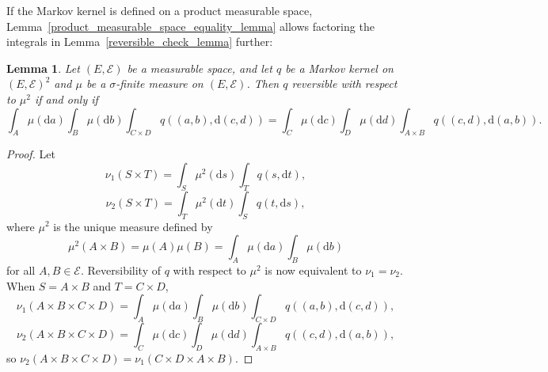 \documentclass[english,twoside,openright]{HYgraduMLDS}
\newtheorem{lemma}{Lemma}[chapter]
\newcommand{\dx}{\mathrm{d}}
\begin{document}
If the Markov kernel is defined on a product measurable space,
Lemma~\ref{product_measurable_space_equality_lemma} allows factoring
the integrals in Lemma~\ref{reversible_check_lemma} further:
\begin{lemma}\label{reversible_check_product_lemma}
	Let \((E, \mathcal{E})\) be a measurable space, and let \(q\) be a Markov
  kernel on \((E, \mathcal{E})^{2}\) and \(\mu\) be a \(\sigma\)-finite measure
  on \((E, \mathcal{E})\).
  Then \(q\) reversible with respect to \(\mu^{2}\) if and only if
  \[
    \int_{A}\mu(\dx a)\int_{B}\mu(\dx b)\int_{C\times D}q((a, b), \dx(c, d))
    = \int_{C}\mu(\dx c)\int_{D}\mu(\dx d)\int_{A\times B}q((c, d), \dx(a, b)).
  \]
\end{lemma}
\begin{proof}
  Let
  \[
    \nu_{1}(S\times T) = \int_{S}\mu^{2}(\dx s)\int_{T}q(s, \dx t),
  \]
  \[
    \nu_{2}(S\times T) = \int_{T}\mu^{2}(\dx t)\int_{S}q(t, \dx s),
  \]
  where \(\mu^{2}\) is the unique measure defined by
  \[
    \mu^{2}(A\times B) = \mu(A)\mu(B) = \int_{A}\mu(\dx a)\int_{B}\mu(\dx b)
  \]
  for all \(A, B\in \mathcal{E}\). Reversibility of \(q\) with respect to
  \(\mu^{2}\) is now equivalent to \(\nu_{1} = \nu_{2}\).
  When \(S = A\times B\) and \(T = C\times D\),
  \[
    \nu_{1}(A\times B\times C\times D)
    = \int_{A}\mu(\dx a)\int_{B}\mu(\dx b)\int_{C\times D}q((a, b), \dx(c, d)),
  \]
  \[
    \nu_{2}(A\times B\times C\times D)
    = \int_{C}\mu(\dx c)\int_{D}\mu(\dx d)\int_{A\times B}q((c, d), \dx(a, b)),
  \]
  so \(\nu_{2}(A\times B\times C\times D) = \nu_{1}(C\times D\times A\times B)\).


\end{proof}
\end{document}
